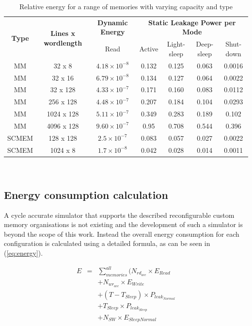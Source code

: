 \documentclass[a4paper,conference]{IEEEtran}
\begin{document}
\begin{center}
	\begin{table}[!t]
	\caption{Relative energy for a range of memories with varying capacity and type}
	\label{tab:relative}
	{\small
	\hfill{}
	\begin{tabular}{|c|c|c|c|c|c|c|}
		\hline
		\multirow{2}{*}{\textbf{Type}} & \multirow{2}{*}{\textbf{Lines x wordlength}} & \textbf{Dynamic Energy}& \multicolumn{4}{c|}{\textbf{Static Leakage Power per Mode}}\\ \cline{3-7}
		& & Read & Active & Light-sleep & Deep-sleep & Shut-down \\ 
		\hline 
		MM & 32 x 8 &  $ 4.18 \times 10^{-8} $ & 0.132 & 0.125 & 0.063 & 0.0016\\ 
		\hline
		MM & 32 x 16 & $  6.79 \times 10^{-8} $ & 0.134 & 0.127 & 0.064 & 0.0022\\ 
		\hline
		MM & 32 x 128 & $  4.33 \times 10^{-7} $ & 0.171 & 0.160 & 0.083 & 0.0112\\ 
		\hline
		MM & 256 x 128 & $  4.48 \times 10^{-7} $ & 0.207 & 0.184 & 0.104 & 0.0293\\ 
		\hline
		MM & 1024 x 128 & $  5.11 \times 10^{-7} $ & 0.349 & 0.283 & 0.189 & 0.102\\ 
		\hline
		MM & 4096 x 128 & $  9.60 \times 10^{-7} $ & 0.95 & 0.708 & 0.544 & 0.396\\ 
		\hline
		SCMEM & 128 x 128 & $  2.5 \times 10^{-7} $ & 0.083 & 0.057 & 0.027 & 0.0022\\ 
		\hline
		SCMEM & 1024 x 8 & $  1.7 \times 10^{-8} $ & 0.042 & 0.028 & 0.014 & 0.0011\\ 
		\hline
	\end{tabular}}
	\hfill{}
	\\
	\end{table}
\end{center}

\subsection{Energy consumption calculation}

A cycle accurate simulator that supports the described reconfigurable custom memory organisations is not existing and the development of such a simulator is beyond the scope of this work.  Instead the overall energy consumption for each configuration is calculated using a detailed formula, as can be seen in (\ref{eq:energy}). 

\setlength{\arraycolsep}{0.0em}
\begin{eqnarray}
\label{eq:energy}
 E &{}= {}&\sum\limits_{memories}^{all}  ( N_{rd_{acc}} \times E_{Read} \nonumber\\
		&&+ N_{wr_{acc}} \times E_{Write} \nonumber\\
		&&+ (T - T_{Sleep}) \times P_{leak_{Normal}} \nonumber\\
		&&+ T_{Sleep} \times P_{leak_{Sleep}} \nonumber\\ 
		&& + N_{SW} \times E_{SleepNormal}
\end{eqnarray}
\setlength{\arraycolsep}{5pt}
\end{document}

